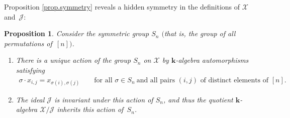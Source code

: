 \documentclass[pdftex]{sigma}
\newtheorem{Proposition}[Theorem]{Proposition}
\numberwithin{equation}{section}
\begin{document}
Proposition \ref{prop.symmetry} reveals a hidden symmetry in the definitions of $\mathcal{X}$ and~$\mathcal{J}$:

\begin{Proposition}\label{prop.symmetry2}Consider the symmetric group $S_{n}$ $($that is, the group of all permutations of~$[n] )$.
\begin{enumerate}\itemsep=0pt
\item[{\rm (a)}] There is a unique action of the group $S_{n}$ on $\mathcal{X}$ by $\mathbf{k}$-algebra automorphisms satisfying
\begin{gather*}
\sigma\cdot x_{i,j}=x_{\sigma(i) ,\sigma(j)}\qquad \text{for all }\sigma\in S_{n}\ \text{and all pairs }(i,j) \text{ of distinct elements of }[n] .
\end{gather*}
\item[{\rm (b)}] The ideal $\mathcal{J}$ is invariant under this action of $S_{n}$, and thus the quotient $\mathbf{k}$-algebra $\mathcal{X}/\mathcal{J}$ inherits this action of~$S_{n}$.
\end{enumerate}
\end{Proposition}
\end{document}
